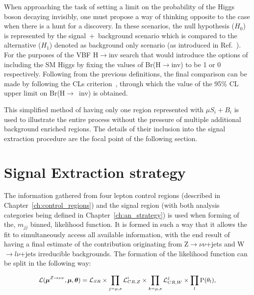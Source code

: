 \hspace{10pt} When approaching the task of setting a limit on the probability of the Higgs boson decaying invisibly, one must propose a way of thinking opposite to the case when there is a hunt for a discovery. In these scenarios, the null hypothesis ($H_0$) is represented by the signal~$+$~background scenario which is compared to the alternative ($H_1$) denoted as background only scenario (as introduced in Ref.~\cite{paper:stat_overview}). For the purposes of the VBF H$\rightarrow$inv search that would introduce the options of including the SM Higgs by fixing the values of Br(H$\rightarrow$inv) to be 1 or 0 respectively. Following from the previous definitions, the final comparison can be made by following the CLs criterion~\cite{paper:stat_overview,paper:cls_intro}, through which the value of the 95\% CL upper limit on Br(H$\rightarrow$~inv) is obtained.

\hspace{10pt} This simplified method of having only one region represented with $\mu S_i+B_i$ is used to illustrate the entire process without the pressure of multiple additional background enriched regions. The details of their inclusion into the signal extraction procedure are the focal point of the following section.
\section{Signal Extraction strategy}
\hspace{10pt} The information gathered from four lepton control regions (described in Chapter~\ref{ch:control_regions}) and the signal region (with both analysis categories being defined in Chapter~\ref{ch:an_strategy}) is used when forming of the, $m_{jj}$ binned, likelihood function. It is formed in such a way that it allows the fit to simultaneously access all available information, with the end result of having a final estimate of the contribution originating from Z$\rightarrow \nu\nu$+jets and W$\rightarrow l\nu$+jets irreducible backgrounds. The formation of the likelihood function can be split in the following way:

\begin{equation}
   \small{ \mathcal{L}(\boldsymbol{\mu}^{Z\rightarrow \nu\nu}, \boldsymbol{\mu}, \boldsymbol{\theta}) =  \mathcal{L}_{SR}\times \prod_{j = \mu, e} \mathcal{L}_{CR,Z}^i \times \prod_{k = \mu, e} \mathcal{L}_{CR,W}^j\times\prod_{l}\text{P}(\theta_l) ,}
    \label{eq:likelihood_total}
\end{equation}

